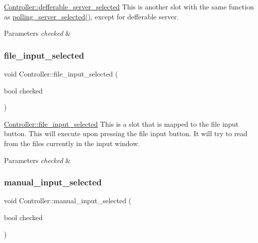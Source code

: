 \hyperlink{classController_a1c4186c6a1366dc848cdeb68261dc12e}{Controller\+::defferable\+\_\+server\+\_\+selected} This is another slot with the same function as \hyperlink{classController_aeca721bb54b3495d2a490d6f658799a5}{polling\+\_\+server\+\_\+selected()}, except for defferable server. 


\begin{DoxyParams}{Parameters}
{\em checked} & \\
\hline
\end{DoxyParams}
\mbox{\label{classController_a7db4c90e6055889682d8521f48c693f6}} 
\subsubsection{\texorpdfstring{file\+\_\+input\+\_\+selected}{file\_input\_selected}}
{\footnotesize\ttfamily void Controller\+::file\+\_\+input\+\_\+selected (\begin{DoxyParamCaption}\item[{bool}]{checked }\end{DoxyParamCaption})\hspace{0.3cm}{\ttfamily [slot]}}



\hyperlink{classController_a7db4c90e6055889682d8521f48c693f6}{Controller\+::file\+\_\+input\+\_\+selected} This is a slot that is mapped to the file input button. This will execute upon pressing the file input button. It will try to read from the files currently in the input window. 


\begin{DoxyParams}{Parameters}
{\em checked} & \\
\hline
\end{DoxyParams}
\mbox{\label{classController_a2daeb91e3a6c79ddfa46fd04770012ff}} 
\subsubsection{\texorpdfstring{manual\+\_\+input\+\_\+selected}{manual\_input\_selected}}
{\footnotesize\ttfamily void Controller\+::manual\+\_\+input\+\_\+selected (\begin{DoxyParamCaption}\item[{bool}]{checked }\end{DoxyParamCaption})\hspace{0.3cm}{\ttfamily [slot]}}



